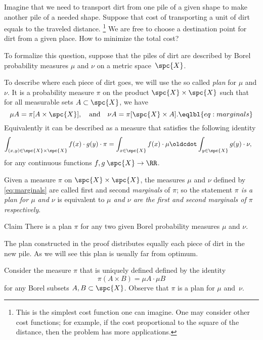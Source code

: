 Imagine that we need to transport dirt from one pile of a given shape to make another pile of a needed shape.
Suppose that cost of transporting a unit of dirt equals to the traveled distance.%
\footnote{This is the simplest cost function one can imagine.
One may consider other cost functions; for example, if the cost proportional to the square of the distance, then the problem has more applications.}
We are free to choose a destination point for dirt from a given place.
How to minimize the total cost?

To formalize this question,
suppose that the piles of dirt are described by Borel probability measures $\mu$ and $\nu$ on a metric space~$\spc{X}$.

To describe where each piece of dirt goes, we will use the so called \emph{plan} for $\mu$ and $\nu$.
It is a probability measure $\pi$ on the product $\spc{X}\times\spc{X}$ such that 
for all measurable sets $A \subset \spc{X}$, we have 
\[\mu A= \pi [A \times \spc{X}],
\quad\text{and}\quad
\nu A=\pi [\spc{X}\times A].
\eqlbl{eq:marginals}\]
Equivalently it can be described as a measure that satisfies the following identity
\begin{align*}
\int_{(x,y)\in \spc{X}\times\spc{X}}f(x)\cdot g(y) \cdot \pi
&=
\int_{x\in \spc{X}}f(x)\cdot \mu
\oldcdot \int_{y\in \spc{X}}g(y)\cdot \nu,
\end{align*}
for any continuous functions $f,g\:\spc{X}\to \RR$.

Given a measure $\pi$ on $\spc{X}\times\spc{X}$, the measures $\mu$ and $\nu$ defined by \ref{eq:marginals} are called first and second \emph{marginals} of $\pi$;
so the statement \textit{$\pi$ is a plan for $\mu$ and $\nu$} is equivalent to \textit{$\mu$ and $\nu$ are the first and second marginals of $\pi$ respectively}.

\begin{thm}{Claim}\label{clm:plan-exists}
There is a plan $\pi$ for any two given Borel probability measures $\mu$ and $\nu$.
\end{thm}

The plan constructed in the proof distributes equally each piece of dirt in the new pile.
As we will see this plan is usually far from optimum.

Consider the measure $\pi$ that is uniquely defined  defined by the identity
\[\pi(A\times B)=\mu A\cdot \mu B\]
for any Borel subsets $A,B\subset\spc{X}$.
Observe that $\pi$ is a plan for $\mu$ and~$\nu$.
\qeds

